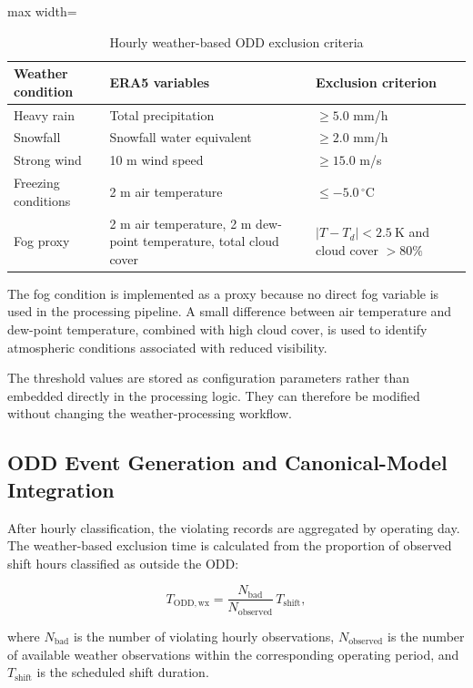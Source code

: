 \begin{table}[htbp]
\small
\renewcommand{\arraystretch}{1.3}
\centering
\caption{Hourly weather-based ODD exclusion criteria}
\label{tab:hourly-weather-odd-criteria}
\begin{adjustbox}{max width=\textwidth}
\begin{tabular}{|p{3.0cm}|p{5.2cm}|p{5.0cm}|}
\hline
\textbf{Weather condition} & \textbf{ERA5 variables} & \textbf{Exclusion criterion} \\
\hline
Heavy rain & Total precipitation & $\geq 5.0$ mm/h \\
\hline
Snowfall & Snowfall water equivalent & $\geq 2.0$ mm/h \\
\hline
Strong wind & 10 m wind speed & $\geq 15.0$ m/s \\
\hline
Freezing conditions & 2 m air temperature & $\leq -5.0\,^\circ$C \\
\hline
Fog proxy & 2 m air temperature, 2 m dew-point temperature, total cloud cover & $\lvert T - T_d \rvert < 2.5\ \mathrm{K}$ and cloud cover $> 80\%$ \\
\hline
\end{tabular}
\end{adjustbox}
\end{table}

The fog condition is implemented as a proxy because no direct fog variable is used in the processing pipeline. A small difference between air temperature and dew-point temperature, combined with high cloud cover, is used to identify atmospheric conditions associated with reduced visibility.

The threshold values are stored as configuration parameters rather than embedded directly in the processing logic. They can therefore be modified without changing the weather-processing workflow.

\subsection{ODD Event Generation and Canonical-Model Integration}
\label{subsec:odd-event-generation-and-canonical-model-integration}
After hourly classification, the violating records are aggregated by operating day. The weather-based exclusion time is calculated from the proportion of observed shift hours classified as outside the ODD:

$$
T_{\mathrm{ODD,wx}} = \frac{N_{\mathrm{bad}}}{N_{\mathrm{observed}}} \, T_{\mathrm{shift}},
$$

where $N_{\mathrm{bad}}$ is the number of violating hourly observations, $N_{\mathrm{observed}}$ is the number of available weather observations within the corresponding operating period, and $T_{\mathrm{shift}}$ is the scheduled shift duration.

